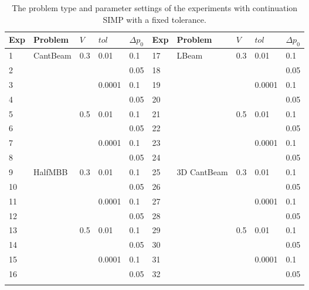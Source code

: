 \begin{table}[H]
\centering
\tabcolsep=0.09cm
\caption{The problem type and parameter settings of the experiments with continuation SIMP with a fixed tolerance.}
\label{tab:exp_params}
\begin{tabular}{|l|l|l|l|l||l|l|l|l|l|}
\hline\noalign{\smallskip}
Exp & Problem & $V$ & $tol$ & $\Delta p_0$ & Exp & Problem & $V$ & $tol$ & $\Delta p_0$ \\
\hline
1 & \multirow{ 8 }{*}{CantBeam} & \multirow{ 4 }{*}{0.3} & \multirow{ 2 }{*}{0.01} & 0.1 & 17 & \multirow{ 8 }{*}{LBeam} & \multirow{ 4 }{*}{0.3} & \multirow{ 2 }{*}{0.01} & 0.1\\
2 & & & & 0.05 & 18 & & & & 0.05\\
3 & & & \multirow{ 2 }{*}{0.0001} & 0.1 & 19 & & & \multirow{ 2 }{*}{0.0001} & 0.1 \\
4 & & & & 0.05 & 20 & & & & 0.05 \\
5 & & \multirow{ 4 }{*}{0.5} & \multirow{ 2 }{*}{0.01} & 0.1 & 21 & & \multirow{ 4 }{*}{0.5} & \multirow{ 2 }{*}{0.01} & 0.1 \\
6 & & & & 0.05 & 22 & & & & 0.05 \\
7 & & & \multirow{ 2 }{*}{0.0001} & 0.1 & 23 & & & \multirow{ 2 }{*}{0.0001} & 0.1 \\
8 & & & & 0.05 & 24 & & & & 0.05 \\
\hline
9 & \multirow{ 8 }{*}{HalfMBB} & \multirow{ 4 }{*}{0.3} & \multirow{ 2 }{*}{0.01} & 0.1 & 25 & \multirow{ 8 }{*}{3D CantBeam} & \multirow{ 4 }{*}{0.3} & \multirow{ 2 }{*}{0.01} & 0.1 \\
10 & & & & 0.05 & 26 & & & & 0.05 \\
11 & & & \multirow{ 2 }{*}{0.0001} & 0.1 & 27 & & & \multirow{ 2 }{*}{0.0001} & 0.1 \\
12 & & & & 0.05 & 28 & & & & 0.05 \\
13 & & \multirow{ 4 }{*}{0.5} & \multirow{ 2 }{*}{0.01} & 0.1 & 29 & & \multirow{ 4 }{*}{0.5} & \multirow{ 2 }{*}{0.01} & 0.1 \\
14 & & & & 0.05 & 30 & & & & 0.05 \\
15 & & & \multirow{ 2 }{*}{0.0001} & 0.1 & 31 & & & \multirow{ 2 }{*}{0.0001} & 0.1 \\
16 & & & & 0.05 & 32 & & & & 0.05 \\
\noalign{\smallskip}\hline
\end{tabular}
\end{table}
